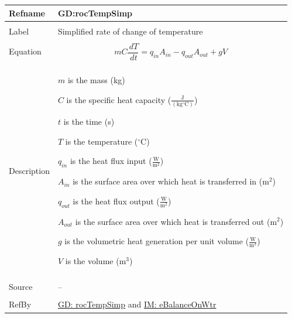 \documentclass[12pt]{article}
\begin{document}
\vspace{\baselineskip}
\noindent
\begin{minipage}{\textwidth}
\begin{tabular}{>{\raggedright}p{}>{\raggedright\arraybackslash}p{}}
\toprule \textbf{Refname} & \textbf{GD:rocTempSimp}
\label{GD:rocTempSimp}
\\ \midrule \\
Label & Simplified rate of change of temperature
        
\\ \midrule \\
Equation & \begin{displaymath}
           m C \frac{\,dT}{\,dt}={q_{in}} {A_{in}}-{q_{out}} {A_{out}}+g V
           \end{displaymath}
\\ \midrule \\
Description & \begin{symbDescription}
              \item{$m$ is the mass (kg)}
              \item{$C$ is the specific heat capacity ($\frac{\text{J}}{(\text{kg}{}^{\circ}\text{C})}$)}
              \item{$t$ is the time (s)}
              \item{$T$ is the temperature (${}^{\circ}$C)}
              \item{${q_{in}}$ is the heat flux input ($\frac{\text{W}}{\text{m}^{2}}$)}
              \item{${A_{in}}$ is the surface area over which heat is transferred in ($\text{m}^{2}$)}
              \item{${q_{out}}$ is the heat flux output ($\frac{\text{W}}{\text{m}^{2}}$)}
              \item{${A_{out}}$ is the surface area over which heat is transferred out ($\text{m}^{2}$)}
              \item{$g$ is the volumetric heat generation per unit volume ($\frac{\text{W}}{\text{m}^{3}}$)}
              \item{$V$ is the volume ($\text{m}^{3}$)}
              \end{symbDescription}
\\ \midrule \\
Source & --
         
\\ \midrule \\
RefBy & \hyperref[GD:rocTempSimp]{GD: rocTempSimp} and \hyperref[IM:eBalanceOnWtr]{IM: eBalanceOnWtr}
        
\\ \bottomrule
\end{tabular}
\end{minipage}
\end{document}
